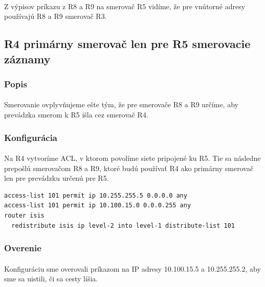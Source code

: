 \documentclass[12pt,twoside,a4paper]{report}
\begin{document}
\paragraph{}
Z výpisov príkazu  z R8 a R9 na smerovač R5 vidíme, že pre vnútorné adresy používajú R8 a R9 smerovač R3.






\subsection{R4 primárny smerovač len pre R5 smerovacie záznamy}
\subsubsection{Popis}
\paragraph{}
Smerovanie ovplyvňujeme ešte tým, že pre smerovače R8 a R9 určíme, aby prevádzka smerom k R5 išla cez smerovač R4.

\subsubsection{Konfigurácia}
\paragraph{}
Na R4 vytvoríme ACL, v ktorom povolíme siete pripojené ku R5. Tie sa následne prepošlú smerovačom R8 a R9, ktoré budú používať R4 ako primárny smerovač len pre prevádzku určenú pre R5.

\noindent
{\selectfont
\begin{small}
\begin{verbatim}
access-list 101 permit ip 10.255.255.5 0.0.0.0 any
access-list 101 permit ip 10.100.15.0 0.0.0.255 any
router isis
  redistribute isis ip level-2 into level-1 distribute-list 101

\end{verbatim}
\end{small}
}

\subsubsection{Overenie}
\paragraph{}
Konfiguráciu sme overovali príkazom  na IP adresy 10.100.15.5 a 10.255.255.2, aby sme sa uistili, či sa cesty líšia.
\end{document}
